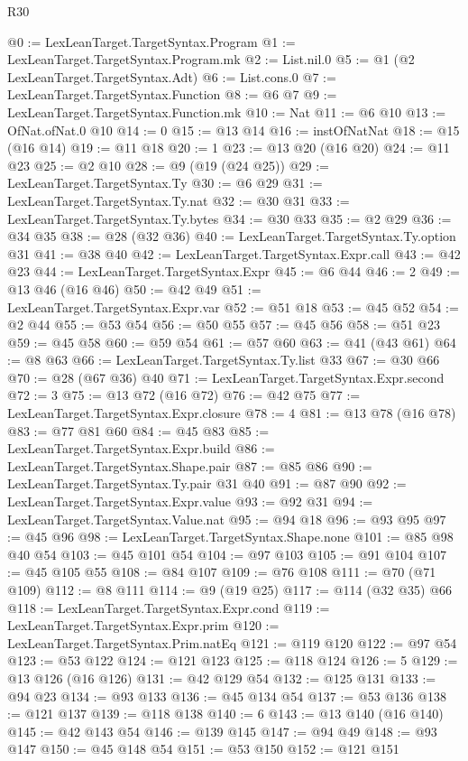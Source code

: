 \begin{lexlean}{R30}
\begin{coremodule}
@0 := LexLeanTarget.TargetSyntax.Program
@1 := LexLeanTarget.TargetSyntax.Program.mk
@2 := List.nil.{0}
@5 := @1 (@2 LexLeanTarget.TargetSyntax.Adt)
@6 := List.cons.{0}
@7 := LexLeanTarget.TargetSyntax.Function
@8 := @6 @7
@9 := LexLeanTarget.TargetSyntax.Function.mk
@10 := Nat
@11 := @6 @10
@13 := OfNat.ofNat.{0} @10
@14 := 0
@15 := @13 @14
@16 := instOfNatNat
@18 := @15 (@16 @14)
@19 := @11 @18
@20 := 1
@23 := @13 @20 (@16 @20)
@24 := @11 @23
@25 := @2 @10
@28 := @9 (@19 (@24 @25))
@29 := LexLeanTarget.TargetSyntax.Ty
@30 := @6 @29
@31 := LexLeanTarget.TargetSyntax.Ty.nat
@32 := @30 @31
@33 := LexLeanTarget.TargetSyntax.Ty.bytes
@34 := @30 @33
@35 := @2 @29
@36 := @34 @35
@38 := @28 (@32 @36)
@40 := LexLeanTarget.TargetSyntax.Ty.option @31
@41 := @38 @40
@42 := LexLeanTarget.TargetSyntax.Expr.call
@43 := @42 @23
@44 := LexLeanTarget.TargetSyntax.Expr
@45 := @6 @44
@46 := 2
@49 := @13 @46 (@16 @46)
@50 := @42 @49
@51 := LexLeanTarget.TargetSyntax.Expr.var
@52 := @51 @18
@53 := @45 @52
@54 := @2 @44
@55 := @53 @54
@56 := @50 @55
@57 := @45 @56
@58 := @51 @23
@59 := @45 @58
@60 := @59 @54
@61 := @57 @60
@63 := @41 (@43 @61)
@64 := @8 @63
@66 := LexLeanTarget.TargetSyntax.Ty.list @33
@67 := @30 @66
@70 := @28 (@67 @36) @40
@71 := LexLeanTarget.TargetSyntax.Expr.second
@72 := 3
@75 := @13 @72 (@16 @72)
@76 := @42 @75
@77 := LexLeanTarget.TargetSyntax.Expr.closure
@78 := 4
@81 := @13 @78 (@16 @78)
@83 := @77 @81 @60
@84 := @45 @83
@85 := LexLeanTarget.TargetSyntax.Expr.build
@86 := LexLeanTarget.TargetSyntax.Shape.pair
@87 := @85 @86
@90 := LexLeanTarget.TargetSyntax.Ty.pair @31 @40
@91 := @87 @90
@92 := LexLeanTarget.TargetSyntax.Expr.value
@93 := @92 @31
@94 := LexLeanTarget.TargetSyntax.Value.nat
@95 := @94 @18
@96 := @93 @95
@97 := @45 @96
@98 := LexLeanTarget.TargetSyntax.Shape.none
@101 := @85 @98 @40 @54
@103 := @45 @101 @54
@104 := @97 @103
@105 := @91 @104
@107 := @45 @105 @55
@108 := @84 @107
@109 := @76 @108
@111 := @70 (@71 @109)
@112 := @8 @111
@114 := @9 (@19 @25)
@117 := @114 (@32 @35) @66
@118 := LexLeanTarget.TargetSyntax.Expr.cond
@119 := LexLeanTarget.TargetSyntax.Expr.prim
@120 := LexLeanTarget.TargetSyntax.Prim.natEq
@121 := @119 @120
@122 := @97 @54
@123 := @53 @122
@124 := @121 @123
@125 := @118 @124
@126 := 5
@129 := @13 @126 (@16 @126)
@131 := @42 @129 @54
@132 := @125 @131
@133 := @94 @23
@134 := @93 @133
@136 := @45 @134 @54
@137 := @53 @136
@138 := @121 @137
@139 := @118 @138
@140 := 6
@143 := @13 @140 (@16 @140)
@145 := @42 @143 @54
@146 := @139 @145
@147 := @94 @49
@148 := @93 @147
@150 := @45 @148 @54
@151 := @53 @150
@152 := @121 @151

\end{coremodule}
\end{lexlean}
